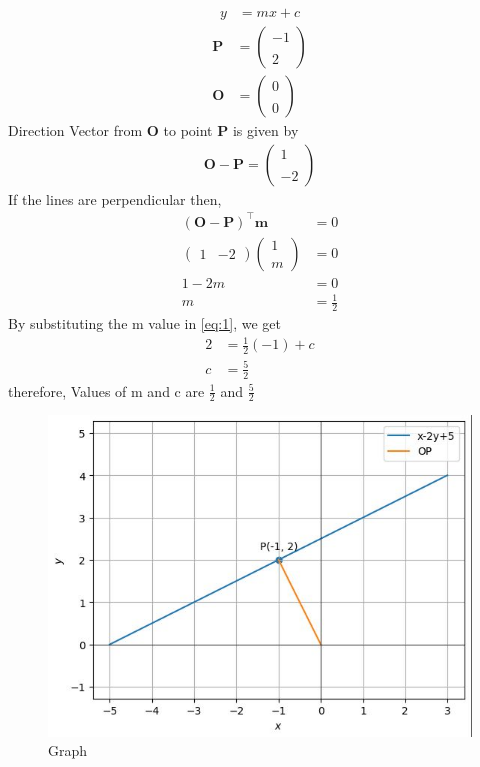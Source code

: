 \documentclass[12pt]{article}
\newcommand{\myvec}[1]{\ensuremath{\begin{pmatrix}#1\end{pmatrix}}}
\let\vec\mathbf
\begin{document}
\begin{align}
   y&=mx+c
 \label{eq:1}
 \end{align}
\begin{align}
  \vec{P}&=\myvec{-1\\ \\2}\\
 \vec{O} &=\myvec{0\\ \\ 0}
\end{align}
   Direction Vector from $\vec{O}$ to point $\vec{P}$ is given by
    \begin{align}
    \vec{O - P} =\myvec{1\\ \\ -2}
 \end{align}
 If the lines are perpendicular then,
 \begin{align}
   \vec{(O - P)}^{\top}\vec{m} &= 0\\
   \myvec{1 & -2}\myvec{1 \\ \\ m}&=0\\
   1 - 2m &= 0\\
   m &= \frac{1}{2}
\end{align}
By substituting the m value in \eqref{eq:1},  we get
 \begin{align}
 2 &=\frac{1}{2} (-1) + c \\
 c &=\frac{5}{2}  
\end{align}
therefore,  Values of m and c are $\frac{1}{2}$ and $\frac{5}{2}$ \\
\begin{figure}[H]
  \centering
  \includegraphics[width=\columnwidth]{figs/graph.jpg}
  \caption{Graph}
  \label{fig:pic}
\end{figure}
\end{document}
